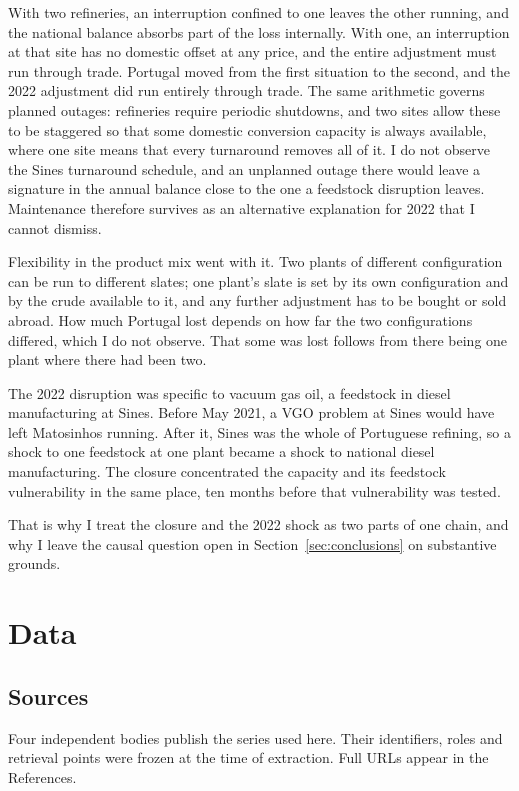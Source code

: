\documentclass[11pt,a4paper]{article}
\begin{document}
With two refineries, an interruption confined to one leaves the other running, and the national
balance absorbs part of the loss internally. With one, an interruption at that site has no
domestic offset at any price, and the entire adjustment must run through trade. Portugal moved
from the first situation to the second, and the 2022 adjustment did run entirely through trade.
The same arithmetic governs planned outages: refineries require periodic shutdowns, and two
sites allow these to be staggered so that some domestic conversion capacity is always available,
where one site means that every turnaround removes all of it. I do not observe the Sines
turnaround schedule, and an unplanned outage there would leave a signature in the annual balance
close to the one a feedstock disruption leaves. Maintenance therefore survives as an alternative
explanation for 2022 that I cannot dismiss.

Flexibility in the product mix went with it. Two plants of different configuration can be run to
different slates; one plant's slate is set by its own configuration and by the crude available
to it, and any further adjustment has to be bought or sold abroad. How much Portugal lost
depends on how far the two configurations differed, which I do not observe. That some was lost
follows from there being one plant where there had been two.

The 2022 disruption was specific to vacuum gas oil, a feedstock in diesel manufacturing at
Sines. Before May 2021, a VGO problem at Sines would have left Matosinhos running. After it,
Sines was the whole of Portuguese refining, so a shock to one feedstock at one plant became a
shock to national diesel manufacturing. The closure concentrated the capacity and its feedstock
vulnerability in the same place, ten months before that vulnerability was tested.

That is why I treat the closure and the 2022 shock as two parts of one chain, and why I leave
the causal question open in Section~\ref{sec:conclusions} on substantive grounds.

\section{Data}

\subsection{Sources}
\label{sec:sources}

Four independent bodies publish the series used here. Their identifiers, roles and retrieval
points were frozen at the time of extraction. Full URLs appear in the References.
\end{document}

